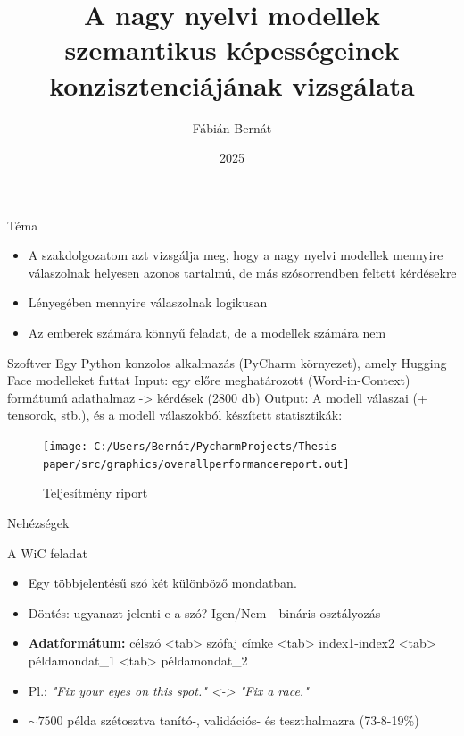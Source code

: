 \documentclass{beamer}
\title{\bf A nagy nyelvi modellek szemantikus képességeinek konzisztenciájának vizsgálata}
\author{Fábián Bernát}
\institute{Programtervező Informatikus BSc\\Szegedi Tudományegyetem}
\date{2025}
\begin{document}
    \frame{\titlepage}

    \begin{frame}{Téma}
        \begin{itemize}
            \item A szakdolgozatom azt vizsgálja meg, hogy a nagy nyelvi modellek mennyire válaszolnak helyesen azonos tartalmú, de más szósorrendben feltett kérdésekre
            \item Lényegében mennyire válaszolnak logikusan
            \item Az emberek számára könnyű feladat, de a modellek számára nem
        \end{itemize}

    \end{frame}

    \begin{frame}{Szoftver}
        Egy Python konzolos alkalmazás (PyCharm környezet), amely Hugging Face modelleket futtat
        Input: egy előre meghatározott (Word-in-Context) formátumú adathalmaz -> kérdések (2800 db)
        Output: A modell válaszai (+ tensorok, stb.), és a modell válaszokból készített statisztikák:
        \begin{figure}
            \centering
            \texttt{[image: C:/Users/Bernát/PycharmProjects/Thesis-paper/src/graphics/overallperformancereport.out]}
            \caption{Teljesítmény riport}
            \label{fig:overallperformancereport.out}
        \end{figure}
    \end{frame}

    \begin{frame}{Nehézségek}

    \end{frame}

    \begin{frame}{A WiC feladat}
        \begin{itemize}

            \item Egy többjelentésű szó két különböző mondatban.
            \item Döntés: ugyanazt jelenti-e a szó? Igen/Nem - bináris osztályozás
            \item \textbf{Adatformátum:} célszó <tab> szófaj címke <tab> index1-index2 <tab> példamondat\_1 <tab> példamondat\_2
            \item Pl.: \textit{"Fix your eyes on this spot." <-> "Fix a race."}
            \item $\sim7500$ példa szétosztva tanító-, validációs- és teszthalmazra (73-8-19\%)
        \end{itemize}
    \end{frame}
\end{document}
